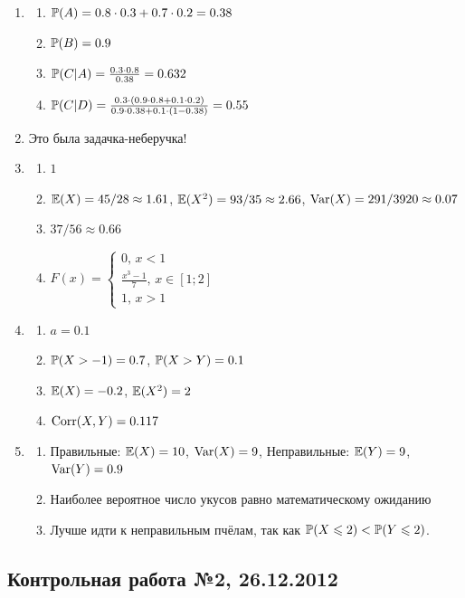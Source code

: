 \documentclass[12pt, a4paper]{article}\usepackage[]{graphicx}\usepackage[]{color}
\begin{document}
\begin{enumerate}
\item
\begin{enumerate}
\item $\P(A)=0.8\cdot 0.3+0.7\cdot 0.2=0.38$
\item $\P(B)=0.9$
\item $\P(C|A)=\frac{0.3\cdot 0.8}{0.38}=0.632$
\item $\P(C|D)=\frac{0.3\cdot (0.9\cdot 0.8+0.1\cdot 0.2)}{0.9\cdot 0.38+0.1\cdot (1-0.38)}=0.55$
\end{enumerate}
\item Это была задачка-неберучка!
\item
\begin{enumerate}
\item $1$
\item $\E(X)=45/28\approx 1.61$, $\E(X^2)=93/35\approx 2.66$, $\Var(X)=291/3920\approx 0.07$
\item $37/56\approx 0.66$
\item $F(x)=\begin{cases} 0,\, x<1 \\
\frac{x^3-1}{7},\, x\in [1;2] \\
1,\, x>1 \end{cases}$
\end{enumerate}
\item
\begin{enumerate}
\item $a=0.1$
\item $\P(X>-1)=0.7$, $\P(X>Y)=0.1$
\item $\E(X)=-0.2$, $\E(X^2)=2$
\item $\Corr(X,Y)=0.117$
\end{enumerate}
\item
\begin{enumerate}
\item Правильные: $\E(X)=10$, $\Var(X)=9$, Неправильные: $\E(Y)=9$, $\Var(Y)=0.9$
\item Наиболее вероятное число укусов равно математическому ожиданию
\item Лучше идти к неправильным пчёлам, так как $\P(X\leq 2)<\P(Y\leq 2)$.
\end{enumerate}
\end{enumerate}


\subsection{Контрольная работа №2, 26.12.2012}
\end{document}
